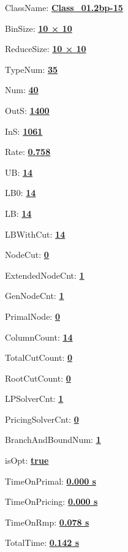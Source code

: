 \documentclass[11pt]{article}
\begin{document}
\pagestyle{empty}


ClassName: \underline{\textbf{Class_01.2bp-15}}
\par
BinSize: \underline{\textbf{10 × 10}}
\par
ReduceSize: \underline{\textbf{10 × 10}}
\par
TypeNum: \underline{\textbf{35}}
\par
Num: \underline{\textbf{40}}
\par
OutS: \underline{\textbf{1400}}
\par
InS: \underline{\textbf{1061}}
\par
Rate: \underline{\textbf{0.758}}
\par
UB: \underline{\textbf{14}}
\par
LB0: \underline{\textbf{14}}
\par
LB: \underline{\textbf{14}}
\par
LBWithCut: \underline{\textbf{14}}
\par
NodeCut: \underline{\textbf{0}}
\par
ExtendedNodeCnt: \underline{\textbf{1}}
\par
GenNodeCnt: \underline{\textbf{1}}
\par
PrimalNode: \underline{\textbf{0}}
\par
ColumnCount: \underline{\textbf{14}}
\par
TotalCutCount: \underline{\textbf{0}}
\par
RootCutCount: \underline{\textbf{0}}
\par
LPSolverCnt: \underline{\textbf{1}}
\par
PricingSolverCnt: \underline{\textbf{0}}
\par
BranchAndBoundNum: \underline{\textbf{1}}
\par
isOpt: \underline{\textbf{true}}
\par
TimeOnPrimal: \underline{\textbf{0.000 s}}
\par
TimeOnPricing: \underline{\textbf{0.000 s}}
\par
TimeOnRmp: \underline{\textbf{0.078 s}}
\par
TotalTime: \underline{\textbf{0.142 s}}
\par
\newpage


\end{document}

